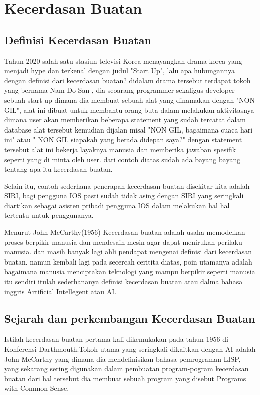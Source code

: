 \section{Kecerdasan Buatan}
\subsection{Definisi Kecerdasan Buatan}
 \hspace{1cm} Tahun 2020 salah satu stasiun televisi Korea menayangkan drama korea yang menjadi hype dan terkenal dengan judul "Start Up", lalu apa hubungannya dengan definisi dari kecerdasan buatan? didalam drama tersebut terdapat tokoh yang bernama Nam Do San , dia seoarang programmer sekaligus developer sebuah start up dimana dia membuat sebuah alat yang dinamakan dengan "NON GIL", alat ini dibuat untuk membantu orang buta dalam melakukan aktivitasnya dimana user akan memberikan beberapa statement yang sudah tercatat dalam database alat tersebut kemudian dijalan misal "NON GIL, bagaimana cuaca hari ini" atau " NON GIL siapakah yang berada didepan saya?" dengan statement tersebut alat ini bekerja layaknya manusia dan memberika jawaban spesifik seperti yang di minta oleh user. dari contoh diatas sudah ada bayang bayang tentang apa itu kecerdasan buatan.
 
\hspace{1cm}Selain itu, contoh sederhana penerapan kecerdasan buatan disekitar kita adalah SIRI, bagi pengguna IOS pasti sudah tidak asing dengan SIRI yang seringkali diartikan sebagai asisten pribadi pengguna IOS dalam melakukan hal hal tertentu untuk penggunanya. 

\hspace{1cm} Menurut John McCarthy(1956) Kecerdasan buatan adalah usaha memodelkan proses berpikir manusia dan mendesain mesin agar dapat menirukan perilaku manusia. dan masih banyak lagi ahli pendapat mengenai definisi dari kecerdasan buatan. namun kembali lagi pada secercah ceritita diatas, poin utamanya adalah bagaimana manusia menciptakan teknologi yang mampu berpikir seperti manusia itu sendiri itulah sederhananya definisi kecerdasan buatan atau dalma bahasa inggris Artificial Intellegent atau AI.

\subsection{Sejarah dan perkembangan Kecerdasan Buatan}
\hspace{1cm} Istilah kecerdasan buatan pertama kali dikemukakan pada tahun 1956 di Konferensi Darthmouth.Tokoh utama yang seringkali dikaitkan dengan AI adalah John McCarthy yang dimana dia mendefinisikan bahasa pemrograman LISP, yang sekarang sering digunakan dalam pembuatan program-pogram kecerdasan buatan dari hal tersebut dia membuat sebuah program yang disebut Programs with Common Sense.

